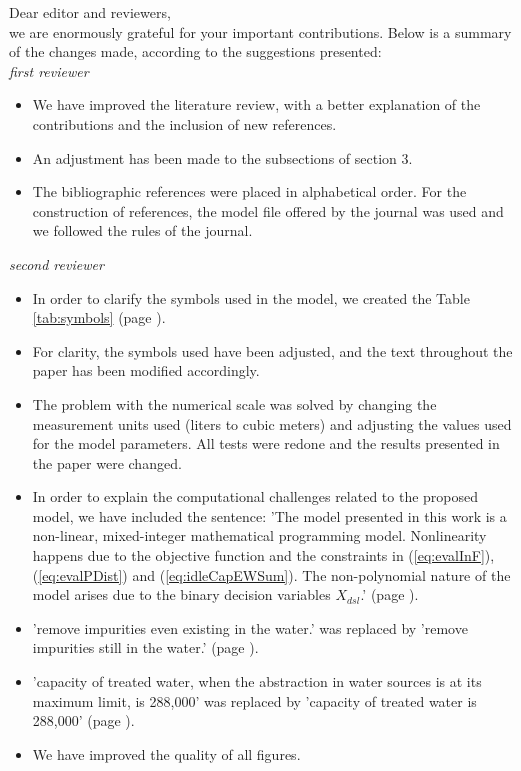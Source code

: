 \documentclass{singlecol}
\theoremstyle{TH}{
\newtheorem{lemma}{Lemma}
\newtheorem{theorem}[lemma]{Theorem}
\newtheorem{corrolary}[lemma]{Corrolary}
\newtheorem{conjecture}[lemma]{Conjecture}
\newtheorem{proposition}[lemma]{Proposition}
\newtheorem{claim}[lemma]{Claim}
\newtheorem{stheorem}[lemma]{Wrong Theorem}
\newtheorem{algorithm}{Algorithm}
}
\theoremstyle{THrm}{
\newtheorem{definition}{Definition}[section]
\newtheorem{question}{Question}[section]
\newtheorem{remark}{Remark}
\newtheorem{scheme}{Scheme}
}
\theoremstyle{THhit}{
\newtheorem{case}{Case}[section]
}
\begin{document}
%


Dear editor and reviewers, \\

we are enormously grateful for your important contributions. Below is a summary of the changes made, according to the suggestions presented: \\

\emph{first reviewer}

\begin{itemize}
\item We have improved the literature review, with a better explanation of the contributions and the inclusion of new references.
\item An adjustment has been made to the subsections of section 3.
\item The bibliographic references were placed in alphabetical order. For the construction of references, the model file offered by the journal was used and we  followed the rules of the journal.

\end{itemize}

\emph{second reviewer}

\begin{itemize}
\item In order to clarify the symbols used in the model, we created the Table \ref{tab:symbols} (page \pageref{tab:symbols}).
\item For clarity, the symbols used have been adjusted, and the text throughout the paper has been modified accordingly.
\item The problem with the numerical scale was solved by changing the measurement units used (liters to cubic meters) and adjusting the values used for the model parameters. All tests were redone and the results presented in the paper were changed.
\item In order to explain the computational challenges related to the proposed model, we have included the sentence: 'The model presented in this work is a non-linear, mixed-integer mathematical programming model. Nonlinearity happens due to the objective function and the constraints in (\ref{eq:evalInF}), (\ref{eq:evalPDist}) and (\ref{eq:idleCapEWSum}). The non-polynomial nature of the model arises due to the binary decision variables $X_{dsl}$.' (page \pageref{nonlinerarityExp}).
\item 'remove impurities even existing in the water.' was replaced by 'remove impurities still in the water.' (page \pageref{firstChange}).
\item 'capacity of treated water, when the abstraction in water sources is at its maximum limit, is 288,000' was replaced by 'capacity of treated water is 288,000' (page \pageref{secondChange}).
\item We have improved the quality of all figures.
\end{itemize}
\end{document}
